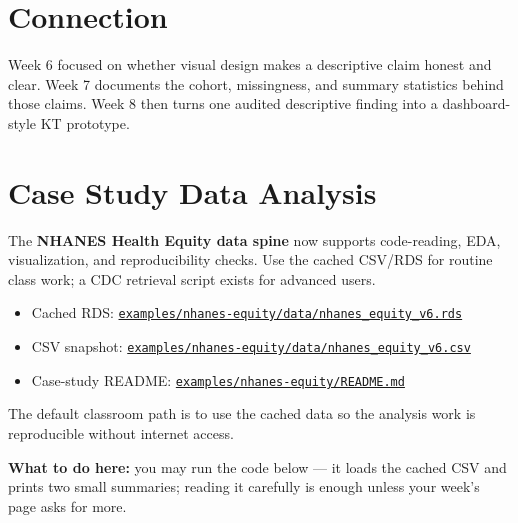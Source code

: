 \documentclass[
  letterpaper,
  DIV=11,
  numbers=noendperiod,
  oneside]{scrreprt}
\providecommand{\tightlist}{%
  \setlength{\itemsep}{0pt}\setlength{\parskip}{0pt}}
\begin{document}
\section*{Connection}\label{connection-6}


Week 6 focused on whether visual design makes a descriptive claim honest
and clear. Week 7 documents the cohort, missingness, and summary
statistics behind those claims. Week 8 then turns one audited
descriptive finding into a dashboard-style KT prototype.

\section*{Case Study Data Analysis}\label{case-study-data-analysis-4}


The \textbf{NHANES Health Equity data spine} now supports code-reading,
EDA, visualization, and reproducibility checks. Use the cached CSV/RDS
for routine class work; a CDC retrieval script exists for advanced
users.

\begin{itemize}
\tightlist
\item
  Cached RDS:
  \href{https://github.com/ehsanx/HDSx/blob/main/examples/nhanes-equity/data/nhanes_equity_v6.rds}{\texttt{examples/nhanes-equity/data/nhanes\_equity\_v6.rds}}
\item
  CSV snapshot:
  \href{https://github.com/ehsanx/HDSx/blob/main/examples/nhanes-equity/data/nhanes_equity_v6.csv}{\texttt{examples/nhanes-equity/data/nhanes\_equity\_v6.csv}}
\item
  Case-study README:
  \href{https://github.com/ehsanx/HDSx/blob/main/examples/nhanes-equity/README.md}{\texttt{examples/nhanes-equity/README.md}}
\end{itemize}

The default classroom path is to use the cached data so the analysis
work is reproducible without internet access.

\textbf{What to do here:} you may run the code below --- it loads the
cached CSV and prints two small summaries; reading it carefully is
enough unless your week's page asks for more.
\end{document}
